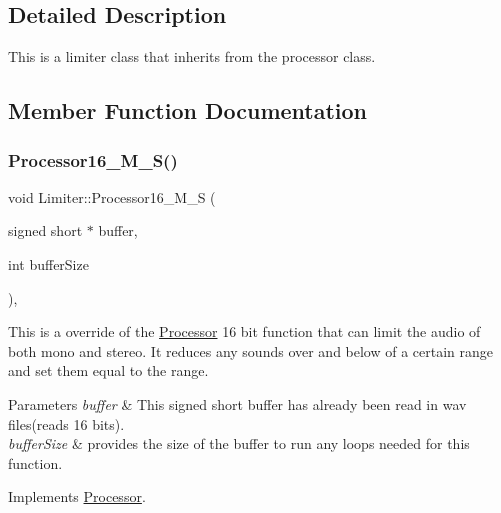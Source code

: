 \subsection{Detailed Description}
This is a limiter class that inherits from the processor class. 

\subsection{Member Function Documentation}
\mbox{\label{classLimiter_ab81f92ad3d76078c424c2f4a8f518ba9}} 
\subsubsection{\texorpdfstring{Processor16\+\_\+\+M\+\_\+\+S()}{Processor16\_M\_S()}}
{\footnotesize\ttfamily void Limiter\+::\+Processor16\+\_\+\+M\+\_\+S (\begin{DoxyParamCaption}\item[{signed short $\ast$}]{buffer,  }\item[{int}]{buffer\+Size }\end{DoxyParamCaption})\hspace{0.3cm}{\ttfamily [override]}, {\ttfamily [virtual]}}



This is a override of the \hyperlink{classProcessor}{Processor} 16 bit function that can limit the audio of both mono and stereo. It reduces any sounds over and below of a certain range and set them equal to the range. 


\begin{DoxyParams}{Parameters}
{\em buffer} & This signed short buffer has already been read in wav files(reads 16 bits). \\
\hline
{\em buffer\+Size} & provides the size of the buffer to run any loops needed for this function. \\
\hline
\end{DoxyParams}


Implements \hyperlink{classProcessor_a2a0903d1ca9e627e8a45e5159ecc0505}{Processor}.

\mbox{\label{classLimiter_acc021d4c3af04a48b8af7bb8853ce654}} 

